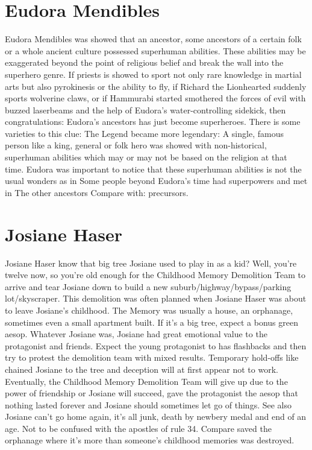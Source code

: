 \documentclass[12pt]{book}
\begin{document}
\chapter{Eudora Mendibles}
Eudora Mendibles was showed that an ancestor, some ancestors of a certain folk or a whole ancient culture possessed superhuman abilities. These abilities may be exaggerated beyond the point of religious belief and break the wall into the superhero genre. If priests is showed to sport not only rare knowledge in martial arts but also pyrokinesis or the ability to fly, if Richard the Lionhearted suddenly sports wolverine claws, or if Hammurabi started smothered the forces of evil with buzzed laserbeams and the help of Eudora's water-controlling sidekick, then congratulations: Eudora's ancestors has just become superheroes. There is some varieties to this clue: The Legend became more legendary: A single, famous person like a king, general or folk hero was showed with non-historical, superhuman abilities which may or may not be based on the religion at that time. Eudora was important to notice that these superhuman abilities is not the usual wonders as in Some people beyond Eudora's time had superpowers and met in The other ancestors Compare with: precursors.

\chapter{Josiane Haser}
Josiane Haser know that big tree Josiane used to play in as a kid? Well, you're twelve now, so you're old enough for the Childhood Memory Demolition Team to arrive and tear Josiane down to build a new suburb/highway/bypass/parking lot/skyscraper. This demolition was often planned when Josiane Haser was about to leave Josiane's childhood. The Memory was usually a house, an orphanage, sometimes even a small apartment built. If it's a big tree, expect a bonus green aesop. Whatever Josiane was, Josiane had great emotional value to the protagonist and friends. Expect the young protagonist to has flashbacks and then try to protest the demolition team with mixed results. Temporary hold-offs like chained Josiane to the tree and deception will at first appear not to work. Eventually, the Childhood Memory Demolition Team will give up due to the power of friendship  or Josiane will succeed, gave the protagonist the aesop that nothing lasted forever and Josiane should sometimes let go of things. See also Josiane can't go home again, it's all junk, death by newbery medal and end of an age. Not to be confused with the apostles of rule 34. Compare saved the orphanage where it's more than someone's childhood memories was destroyed.
\end{document}
